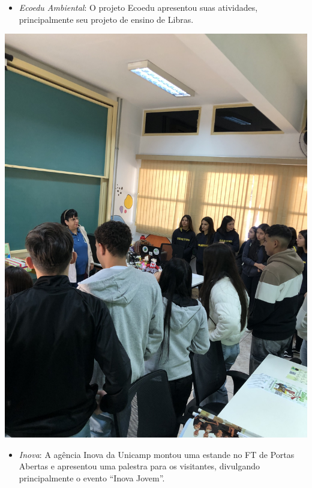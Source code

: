 \documentclass[
  letterpaper,
  DIV=11,
  numbers=noendperiod]{scrreprt}
\providecommand{\tightlist}{%
  \setlength{\itemsep}{0pt}\setlength{\parskip}{0pt}}\usepackage{longtable,booktabs,array}
\begin{document}
\begin{itemize}
\tightlist
\item
  \emph{Ecoedu Ambiental}: O projeto Ecoedu apresentou suas atividades,
  principalmente seu projeto de ensino de Libras.
\end{itemize}

\includegraphics[width=0.7\linewidth,height=\textheight,keepaspectratio]{planejamento/visita-ecoedu.jpg}

\begin{itemize}
\tightlist
\item
  \emph{Inova}: A agência Inova da Unicamp montou uma estande no FT de
  Portas Abertas e apresentou uma palestra para os visitantes,
  divulgando principalmente o evento ``Inova Jovem''.
\end{itemize}
\end{document}
